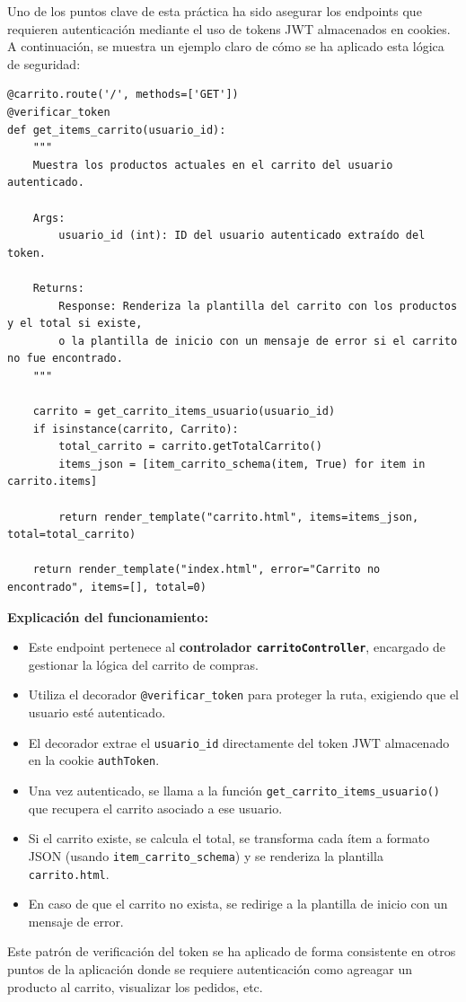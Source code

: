 \documentclass[10pt]{book}
\begin{document}
Uno de los puntos clave de esta práctica ha sido asegurar los endpoints que requieren autenticación mediante el uso de tokens JWT almacenados en cookies. A continuación, se muestra un ejemplo claro de cómo se ha aplicado esta lógica de seguridad:

\begin{lstlisting}[style=pythonclean, caption={Endpoint protegido para mostrar el carrito}]
@carrito.route('/', methods=['GET'])
@verificar_token
def get_items_carrito(usuario_id):
    """
    Muestra los productos actuales en el carrito del usuario autenticado.

    Args:
        usuario_id (int): ID del usuario autenticado extraído del token.

    Returns:
        Response: Renderiza la plantilla del carrito con los productos y el total si existe,
        o la plantilla de inicio con un mensaje de error si el carrito no fue encontrado.
    """

    carrito = get_carrito_items_usuario(usuario_id)
    if isinstance(carrito, Carrito):
        total_carrito = carrito.getTotalCarrito()
        items_json = [item_carrito_schema(item, True) for item in carrito.items]
        
        return render_template("carrito.html", items=items_json, total=total_carrito)

    return render_template("index.html", error="Carrito no encontrado", items=[], total=0)
\end{lstlisting}

\textbf{Explicación del funcionamiento:}
\begin{itemize}
    \item Este endpoint pertenece al \textbf{controlador \texttt{carritoController}}, encargado de gestionar la lógica del carrito de compras.
    \item Utiliza el decorador \texttt{@verificar\_token} para proteger la ruta, exigiendo que el usuario esté autenticado.
    \item El decorador extrae el \texttt{usuario\_id} directamente del token JWT almacenado en la cookie \texttt{authToken}.
    \item Una vez autenticado, se llama a la función \texttt{get\_carrito\_items\_usuario()} que recupera el carrito asociado a ese usuario.
    \item Si el carrito existe, se calcula el total, se transforma cada ítem a formato JSON (usando \texttt{item\_carrito\_schema}) y se renderiza la plantilla \texttt{carrito.html}.
    \item En caso de que el carrito no exista, se redirige a la plantilla de inicio con un mensaje de error.
\end{itemize}
Este patrón de verificación del token se ha aplicado de forma consistente en otros puntos de la aplicación donde se requiere autenticación como agreagar un producto al carrito, visualizar los pedidos, etc. \\
\end{document}
